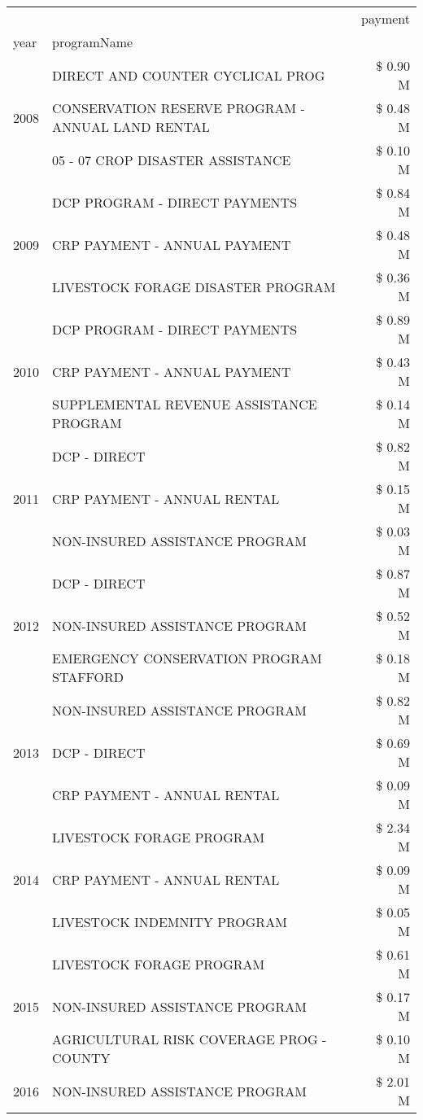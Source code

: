 \begin{tabular}{llr}
\toprule
 &  & payment \\
year & programName &  \\
\midrule
\multirow[t]{3}{*}{2008} & DIRECT AND COUNTER CYCLICAL PROG & \$ 0.90 M \\
 & CONSERVATION RESERVE PROGRAM - ANNUAL LAND RENTAL & \$ 0.48 M \\
 & 05 - 07 CROP DISASTER ASSISTANCE & \$ 0.10 M \\
\cline{1-3}
\multirow[t]{3}{*}{2009} & DCP PROGRAM - DIRECT PAYMENTS & \$ 0.84 M \\
 & CRP PAYMENT - ANNUAL PAYMENT & \$ 0.48 M \\
 & LIVESTOCK FORAGE DISASTER  PROGRAM & \$ 0.36 M \\
\cline{1-3}
\multirow[t]{3}{*}{2010} & DCP PROGRAM - DIRECT PAYMENTS & \$ 0.89 M \\
 & CRP PAYMENT - ANNUAL PAYMENT & \$ 0.43 M \\
 & SUPPLEMENTAL REVENUE ASSISTANCE PROGRAM & \$ 0.14 M \\
\cline{1-3}
\multirow[t]{3}{*}{2011} & DCP - DIRECT & \$ 0.82 M \\
 & CRP PAYMENT - ANNUAL RENTAL & \$ 0.15 M \\
 & NON-INSURED ASSISTANCE PROGRAM & \$ 0.03 M \\
\cline{1-3}
\multirow[t]{3}{*}{2012} & DCP - DIRECT & \$ 0.87 M \\
 & NON-INSURED ASSISTANCE PROGRAM & \$ 0.52 M \\
 & EMERGENCY CONSERVATION PROGRAM STAFFORD & \$ 0.18 M \\
\cline{1-3}
\multirow[t]{3}{*}{2013} & NON-INSURED ASSISTANCE PROGRAM & \$ 0.82 M \\
 & DCP - DIRECT & \$ 0.69 M \\
 & CRP PAYMENT - ANNUAL RENTAL & \$ 0.09 M \\
\cline{1-3}
\multirow[t]{3}{*}{2014} & LIVESTOCK FORAGE PROGRAM & \$ 2.34 M \\
 & CRP PAYMENT - ANNUAL RENTAL & \$ 0.09 M \\
 & LIVESTOCK INDEMNITY PROGRAM & \$ 0.05 M \\
\cline{1-3}
\multirow[t]{3}{*}{2015} & LIVESTOCK FORAGE PROGRAM & \$ 0.61 M \\
 & NON-INSURED ASSISTANCE PROGRAM & \$ 0.17 M \\
 & AGRICULTURAL RISK COVERAGE PROG - COUNTY & \$ 0.10 M \\
\cline{1-3}
\multirow[t]{3}{*}{2016} & NON-INSURED ASSISTANCE PROGRAM & \$ 2.01 M \\

\end{tabular}
